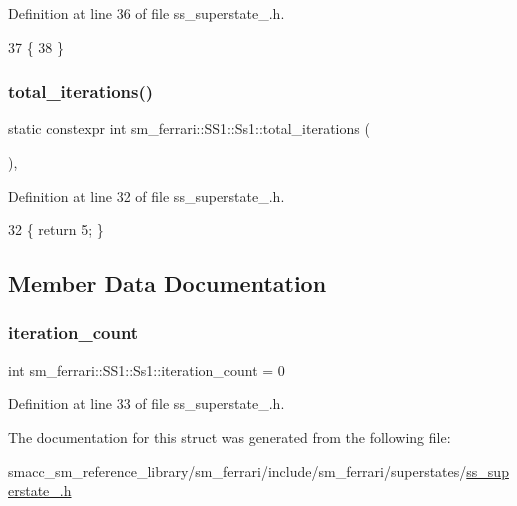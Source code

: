 Definition at line 36 of file ss\+\_\+superstate\+\_.\+h.


\begin{DoxyCode}
37     \{
38     \}
\end{DoxyCode}
\mbox{\label{structsm__ferrari_1_1SS1_1_1Ss1_a3d93e51d5e3b227103fa97d413b8a4a9}} 
\subsubsection{\texorpdfstring{total\+\_\+iterations()}{total\_iterations()}}
{\footnotesize\ttfamily static constexpr int sm\+\_\+ferrari\+::\+S\+S1\+::\+Ss1\+::total\+\_\+iterations (\begin{DoxyParamCaption}{ }\end{DoxyParamCaption})\hspace{0.3cm}{\ttfamily [inline]}, {\ttfamily [static]}}



Definition at line 32 of file ss\+\_\+superstate\+\_.\+h.


\begin{DoxyCode}
32 \{ \textcolor{keywordflow}{return} 5; \}
\end{DoxyCode}


\subsection{Member Data Documentation}
\mbox{\label{structsm__ferrari_1_1SS1_1_1Ss1_a00f5c12752a8e4666f26c05995e25ad7}} 
\subsubsection{\texorpdfstring{iteration\+\_\+count}{iteration\_count}}
{\footnotesize\ttfamily int sm\+\_\+ferrari\+::\+S\+S1\+::\+Ss1\+::iteration\+\_\+count = 0}



Definition at line 33 of file ss\+\_\+superstate\+\_.\+h.



The documentation for this struct was generated from the following file\+:\begin{DoxyCompactItemize}
\item 
smacc\+\_\+sm\+\_\+reference\+\_\+library/sm\+\_\+ferrari/include/sm\+\_\+ferrari/superstates/\hyperlink{sm__ferrari_2include_2sm__ferrari_2superstates_2ss__superstate__1_8h}{ss\+\_\+superstate\+\_.\+h}\end{DoxyCompactItemize}
